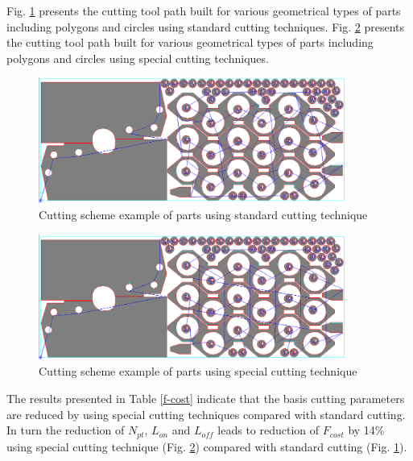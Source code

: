 \documentclass[runningheads]{llncs}
\begin{document}
Fig. \ref{spec-a}
presents the cutting tool path built for various geometrical types of parts
including polygons and circles using standard cutting techniques.
Fig. \ref{spec-b} presents the cutting tool path built for various geometrical types of parts
including polygons and circles using special cutting techniques.

\begin{figure}
  \begin{center}
  \includegraphics[width=0.9\textwidth]{spec-a.png}
  \caption{Cutting scheme example of parts using standard cutting technique}
  \label{spec-a}
  \end{center}
\end{figure}

\begin{figure}
  \begin{center}
  \includegraphics[width=0.9\textwidth]{spec-b.png}
  \caption{Cutting scheme example of parts using special cutting technique}
  \label{spec-b}
  \end{center}
\end{figure}

The results presented in Table \ref{f-cost} indicate that
the basis cutting parameters are reduced by using special cutting techniques
compared with standard cutting.
In turn the reduction of $N_{pt}$, $L_{on}$ and $L_{off}$
leads to reduction of $F_{cost}$  by 14\%
using special cutting technique (Fig. \ref{spec-b})
compared with standard cutting (Fig. \ref{spec-a}).
\end{document}
